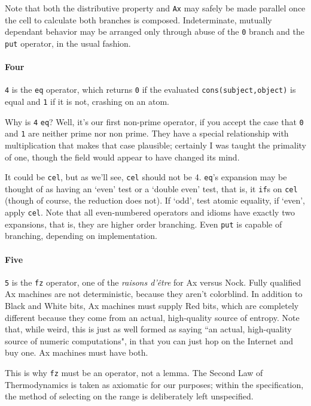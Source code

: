 \documentclass[twoside]{article}
\begin{document}
Note that both the distributive property and \texttt{Ax} may safely be made parallel once the cell to calculate both branches is composed. Indeterminate, mutually dependant behavior may be arranged only through abuse of the \texttt{0} branch and the \texttt{put} operator, in the usual fashion. 

\paragraph{Four}

\texttt{4} is the \texttt{eq} operator, which returns \texttt{0} if the evaluated \texttt{cons(subject,object)} is equal and \texttt{1} if it is not, crashing on an atom.

Why is \texttt{4} \texttt{eq}? Well, it's our first non-prime operator, if you accept the case that \texttt{0} and \texttt{1} are neither prime nor non prime. They have a special relationship with multiplication that makes that case plausible; certainly I was taught the primality of one, though the field would appear to have changed its mind. 

It could be \texttt{cel}, but as we'll see, \texttt{cel} should not be 4. \texttt{eq}'s expansion may be thought of as having an `even' test or a `double even' test, that is, it \texttt{if}s on \texttt{cel} (though of course, the reduction does not). If `odd', test atomic equality, if `even', apply \texttt{cel}. 
Note that all even-numbered operators and idioms have exactly two expansions, that is, they are higher order branching. Even \texttt{put} is capable of branching, depending on implementation.

\paragraph{Five}

\texttt{5} is the \texttt{fz} operator, one of the \emph{raisons d'être} for Ax versus Nock.  %
Fully qualified Ax machines are not deterministic, because they aren't colorblind. In addition to Black and White bits, Ax machines must supply Red bits, which are completely different because they come from an actual, high-quality source of entropy. Note that, while weird, this is just as well formed as saying ``an actual, high-quality source of numeric computations", in that you can just hop on the Internet and buy one. Ax machines must have both.

This is why \texttt{fz} must be an operator, not a lemma. The Second Law of Thermodynamics is taken as axiomatic for our purposes; within the specification, the method of selecting on the range is deliberately left unspecified.
\end{document}
